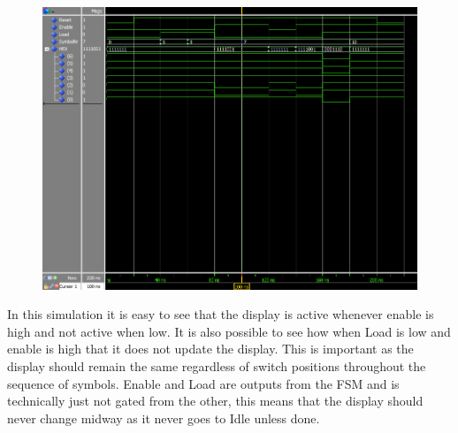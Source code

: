 \documentclass{article}
\begin{document}
\clearpage
\begin{figure}[h]
    \centering
    \includegraphics[width=1\textwidth]{Figures/DecoderTB.PNG}
    \label{fig:TB_Decoder}
\end{figure}
In this simulation it is easy to see that the display is active whenever enable is high and not active when low. It is also possible to see how when Load is low and enable is high that it does not update the display. This is important as the display should remain the same regardless of switch positions throughout the sequence of symbols. Enable and Load are outputs from the FSM and is technically just not gated from the other, this means that the display should never change midway as it never goes to Idle unless done.
\end{document}
